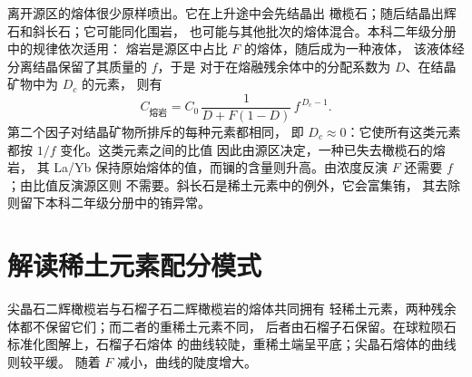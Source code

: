 离开源区的熔体很少原样喷出。它在上升途中会先结晶出
橄榄石；随后结晶出辉石和斜长石；它可能同化围岩，
也可能与其他批次的熔体混合。本科二年级分册中的规律依次适用：
熔岩是源区中占比 $F$ 的熔体，随后成为一种液体，
该液体经分离结晶保留了其质量的 $f$，于是
对于在熔融残余体中的分配系数为 $D$、在结晶矿物中为 $D_c$ 的元素，
则有
\[
C_{\text{熔岩}} = C_0\,\frac{1}{D + F(1 - D)}\,f^{\,D_c - 1}.
\]
第二个因子对结晶矿物所排斥的每种元素都相同，
即 $D_c \approx 0$：它使所有这类元素都按 $1/f$ 变化。这类元素之间的比值
因此由源区决定，一种已失去橄榄石的熔岩，
其 La/Yb 保持原始熔体的值，而镧的含量则升高。由浓度反演 $F$
还需要 $f$；由比值反演源区则
不需要。斜长石是稀土元素中的例外，它会富集铕，
其去除则留下本科二年级分册中的铕异常。

\section{解读稀土元素配分模式}\label{sec:b3:trace-element-modelling:patterns}

尖晶石二辉橄榄岩与石榴子石二辉橄榄岩的熔体共同拥有
轻稀土元素，两种残余体都不保留它们；而二者的重稀土元素不同，
后者由石榴子石保留。在球粒陨石标准化图解上，石榴子石熔体
的曲线较陡，重稀土端呈平底；尖晶石熔体的曲线则较平缓。
随着 $F$ 减小，曲线的陡度增大。


